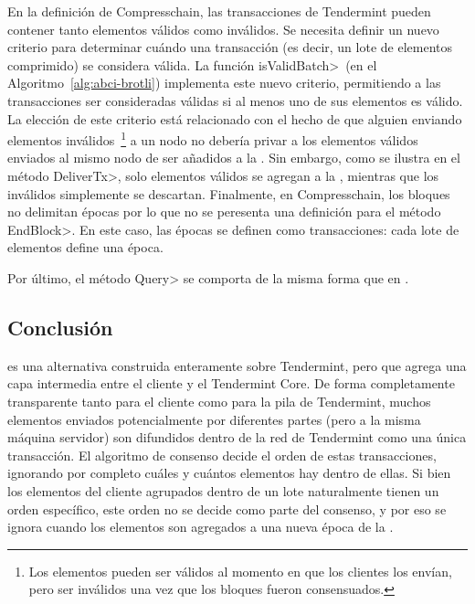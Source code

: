 En la definición de Compresschain, las transacciones de Tendermint pueden contener tanto elementos válidos
como inválidos.
%
Se necesita definir un nuevo criterio para determinar cuándo una transacción (es decir, un lote de elementos
comprimido) se considera válida.
%
La función \<isValidBatch>~(en el Algoritmo~\ref{alg:abci-brotli}) implementa este nuevo criterio, permitiendo
a las transacciones ser consideradas válidas si al menos uno de sus elementos es válido.
%
La elección de este criterio está relacionado con el hecho de que alguien enviando elementos inválidos~\footnote{
Los elementos pueden ser válidos al momento en que los clientes los envían, pero ser inválidos una vez que
los bloques fueron consensuados.} a un nodo no debería privar a los elementos válidos enviados al mismo nodo de
ser añadidos a la \setchain.
%
Sin embargo, como se ilustra en el método \<DeliverTx>, solo elementos válidos se agregan a la \setchain,
mientras que los inválidos simplemente se descartan.
%
Finalmente, en Compresschain, los bloques no delimitan épocas por lo que no se peresenta una definición para
el método \<EndBlock>.
En este caso, las épocas se definen como transacciones: cada lote de elementos define una época.

%

Por último, el método \<Query> se comporta de la misma forma que en \vanilla.

\subsection{Conclusión}
\compresschain es una alternativa construida enteramente sobre Tendermint, pero que agrega una capa
intermedia entre el cliente y el Tendermint Core.
De forma completamente transparente tanto para el
cliente como para la pila de Tendermint, muchos elementos enviados potencialmente por diferentes partes
(pero a la misma máquina servidor)
son difundidos dentro de la red de Tendermint como una única transacción.
El algoritmo de consenso
decide el orden de estas transacciones, ignorando por completo cuáles y cuántos elementos hay dentro de ellas.
Si bien los elementos del cliente agrupados dentro de un lote naturalmente tienen un orden específico,
este orden no se decide como parte del consenso, y por eso se ignora cuando los elementos son agregados
a una nueva época de la \setchain.


